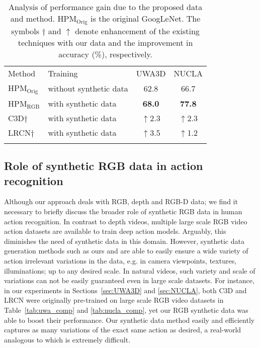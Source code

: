 \documentclass[twocolumn]{svjour3}          \smartqed  \usepackage{graphicx}
\begin{document}
\begin{table}[t]
\centering
\caption{Analysis of performance gain due to the proposed data and method. HPM$_{\text{Orig}}$ is the original GoogLeNet. The symbols $\dagger$ and $\uparrow$ denote  enhancement of the existing techniques with our  data and the improvement in accuracy (\%), respectively.}
\label{tab:improvement_compare}
\begin{tabular}{llcc}
\hline\noalign{\smallskip}
Method & Training & \multicolumn{1}{l}{UWA3D} & \multicolumn{1}{l}{NUCLA} \\ 

\noalign{\smallskip}\hline\noalign{\smallskip}

HPM$_{\mathrm{Orig}}$ & without synthetic data & 62.8 & 66.7 \\ HPM$_{\mathrm{RGB}}$ & with synthetic data & \bf{68.0} & \textbf{77.8} \\ 

\noalign{\smallskip}\hline\noalign{\smallskip}



C3D$\dagger$ & with synthetic data &$\uparrow$2.3 & $\uparrow$2.3\\ 
LRCN$\dagger$ & with synthetic data & $\uparrow$3.5 & $\uparrow$1.2\\

\hline\noalign{\smallskip}
\end{tabular}
\end{table}




\subsection{Role of synthetic RGB data in action recognition}
Although our approach deals with RGB, depth and RGB-D data;  we find it necessary to briefly discuss the broader role of synthetic RGB data in human action recognition. In contrast to depth videos, multiple large scale RGB video action datasets are available to train deep action models. Arguably, this diminishes the need of synthetic data in this domain.
However, synthetic data generation methods such as ours and \citep{varol17} are able to easily ensure a wide variety of action irrelevant variations in the data, e.g. in camera viewpoints, textures, illuminations; up to any desired scale.  In natural videos, such variety and scale of variations can not be easily guaranteed even in large scale datasets.  For instance,  in our experiments in Sections~\ref{sec:UWA3D} and \ref{sec:NUCLA}, both C3D and LRCN were originally pre-trained on large scale RGB video datasets in Table~\ref{tab:uwa_comp} and \ref{tab:nucla_comp}, yet our RGB synthetic data was able to boost their  performance.  Our synthetic data method easily and efficiently captures as many variations of  the exact same action as desired, a real-world analogous to which is extremely difficult.
\end{document}
